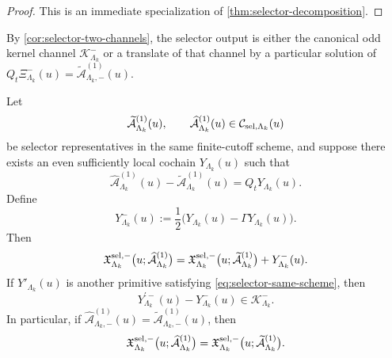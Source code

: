 \documentclass[11pt]{article}
\begin{document}
\begin{proof}
This is an immediate specialization of \cref{thm:selector-decomposition}.
\end{proof}

\begin{remark}
\label{rem:selector-two-sources}
By \cref{cor:selector-two-channels}, the selector output is either the canonical odd kernel channel
\(\mathcal K^-_{\Lambda_k}\) or a translate of that channel by a particular solution of
\(
Q_t\Xi^-_{\Lambda_k}(u)=\widetilde{\mathcal A}^{(1)}_{\Lambda_k,-}(u)
\).
\end{remark}

\begin{proposition}
\label{prop:selector-same-scheme}
Let
\[
\widetilde{\mathcal A}^{(1)}_{\Lambda_k}(u),
\qquad
\widehat{\mathcal A}^{(1)}_{\Lambda_k}(u)
\in
\mathcal C_{{\rm sel},\Lambda_k}(u)
\]
be selector representatives in the same finite-cutoff scheme, and suppose there exists an even
sufficiently local cochain \(Y_{\Lambda_k}(u)\) such that
\begin{equation}
\widehat{\mathcal A}^{(1)}_{\Lambda_k}(u)
-
\widetilde{\mathcal A}^{(1)}_{\Lambda_k}(u)
=
Q_tY_{\Lambda_k}(u).
\label{eq:selector-same-scheme}
\end{equation}
Define
\[
Y^-_{\Lambda_k}(u)
:=
\frac12\Big(
Y_{\Lambda_k}(u)-\Gamma Y_{\Lambda_k}(u)
\Big).
\]
Then
\[
\mathfrak X_{\Lambda_k}^{{\rm sel},-}
\big(u;\widehat{\mathcal A}^{(1)}_{\Lambda_k}\big)
=
\mathfrak X_{\Lambda_k}^{{\rm sel},-}
\big(u;\widetilde{\mathcal A}^{(1)}_{\Lambda_k}\big)
+
Y^-_{\Lambda_k}(u).
\]
If \(Y'_{\Lambda_k}(u)\) is another primitive satisfying
\eqref{eq:selector-same-scheme}, then
\[
Y_{\Lambda_k}^{\prime -}(u)-Y^-_{\Lambda_k}(u)\in \mathcal K^-_{\Lambda_k}.
\]
In particular, if
\(
\widehat{\mathcal A}^{(1)}_{\Lambda_k,-}(u)
=
\widetilde{\mathcal A}^{(1)}_{\Lambda_k,-}(u)
\),
then
\[
\mathfrak X_{\Lambda_k}^{{\rm sel},-}
\big(u;\widehat{\mathcal A}^{(1)}_{\Lambda_k}\big)
=
\mathfrak X_{\Lambda_k}^{{\rm sel},-}
\big(u;\widetilde{\mathcal A}^{(1)}_{\Lambda_k}\big).
\]
\end{proposition}
\end{document}
